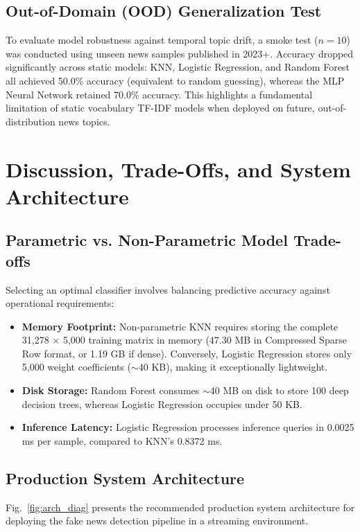 \documentclass[conference]{IEEEtran}
\begin{document}
\subsection{Out-of-Domain (OOD) Generalization Test}
To evaluate model robustness against temporal topic drift, a smoke test ($n=10$) was conducted using unseen news samples published in 2023+. Accuracy dropped significantly across static models: KNN, Logistic Regression, and Random Forest all achieved 50.0\% accuracy (equivalent to random guessing), whereas the MLP Neural Network retained 70.0\% accuracy. This highlights a fundamental limitation of static vocabulary TF-IDF models when deployed on future, out-of-distribution news topics.

\section{Discussion, Trade-Offs, and System Architecture}

\subsection{Parametric vs. Non-Parametric Model Trade-offs}
Selecting an optimal classifier involves balancing predictive accuracy against operational requirements:
\begin{itemize}
    \item \textbf{Memory Footprint:} Non-parametric KNN requires storing the complete 31,278 $\times$ 5,000 training matrix in memory (47.30 MB in Compressed Sparse Row format, or 1.19 GB if dense). Conversely, Logistic Regression stores only 5,000 weight coefficients ($\sim$40 KB), making it exceptionally lightweight.
    \item \textbf{Disk Storage:} Random Forest consumes $\sim$40 MB on disk to store 100 deep decision trees, whereas Logistic Regression occupies under 50 KB.
    \item \textbf{Inference Latency:} Logistic Regression processes inference queries in 0.0025 ms per sample, compared to KNN's 0.8372 ms.
\end{itemize}

\subsection{Production System Architecture}
Fig.~\ref{fig:arch_diag} presents the recommended production system architecture for deploying the fake news detection pipeline in a streaming environment.
\end{document}
